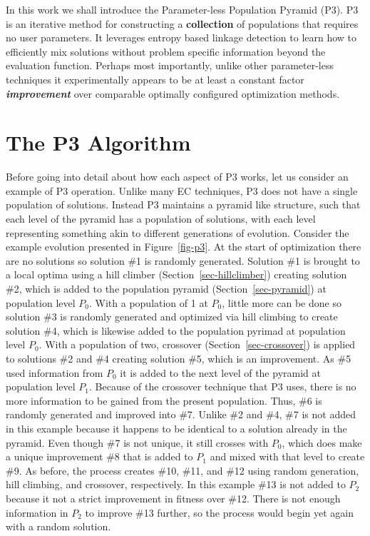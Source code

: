 \documentclass{sig-alternate}
\begin{document}
In this work we shall introduce the Parameter-less Population Pyramid
(P3).  P3 is an iterative method for constructing a \textbf{collection} of
populations that requires no user parameters.  It leverages entropy based
linkage detection to learn how to efficiently mix solutions without
problem specific information beyond the evaluation function.  Perhaps
most importantly, unlike other parameter-less techniques it
experimentally appears to be at least a constant factor
\emph{\textbf{improvement}} over comparable optimally configured
optimization methods.

\section{The P3 Algorithm}
\label{sec-p3}
Before going into detail about how each aspect of P3 works, let us
consider an example of P3 operation. Unlike many EC techniques, P3
does not have a single population of solutions.  Instead P3 maintains
a pyramid like structure, such that each level of the pyramid has a
population of solutions, with each level representing something akin
to different generations of evolution. Consider the example evolution
presented in Figure~\ref{fig-p3}.  At the start of optimization there
are no solutions so solution \#1 is randomly generated.  Solution \#1
is brought to a local optima using a hill climber
(Section~\ref{sec-hillclimber}) creating solution \#2, which is added
to the population pyramid (Section~\ref{sec-pyramid}) at population
level $P_0$.  With a population of 1 at $P_0$, little more can be done
so solution \#3 is randomly generated and optimized via hill climbing
to create solution \#4, which is likewise added to the population
pyrimad at population level $P_0$.  With a population of two,
crossover (Section~\ref{sec-crossover}) is applied to solutions \#2
and \#4 creating solution \#5, which is an improvement. As \#5 used
information from $P_0$ it is added to the next level of the pyramid at
population level $P_1$.  Because of the crossover technique that P3
uses, there is no more information to be gained from the present
population. Thus, \#6 is randomly
generated and improved into \#7.  Unlike \#2 and \#4, \#7 is not added
in this example because it happens to be identical to a solution
already in the pyramid.  Even though \#7 is not unique, it still
crosses with $P_0$, which does make a unique improvement \#8 that is
added to $P_1$ and mixed with that level to create \#9.  As before,
the process creates \#10, \#11, and \#12 using random generation, hill
climbing, and crossover, respectively.  In this example \#13 is not
added to $P_2$ because it not a strict improvement in fitness over
\#12.  There is not enough information in $P_2$ to improve \#13
further, so the process would begin yet again with a random solution.
\end{document}

